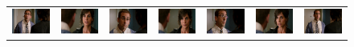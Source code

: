 \begin{figure}
\begin{center}
\begin{tabular}{c c c c c c c}
\includegraphics[width=0.11\linewidth]
  {fig/pat1/dinnerForSchmucks/01.jpg}
& \includegraphics[width=0.11\linewidth]
  {fig/pat1/dinnerForSchmucks/02.jpg}
& \includegraphics[width=0.11\linewidth]
  {fig/pat1/dinnerForSchmucks/03.jpg}
& \includegraphics[width=0.11\linewidth]
  {fig/pat1/dinnerForSchmucks/04.jpg}
& \includegraphics[width=0.11\linewidth]
  {fig/pat1/dinnerForSchmucks/05.jpg}
& \includegraphics[width=0.11\linewidth]
  {fig/pat1/dinnerForSchmucks/06.jpg}
& \includegraphics[width=0.11\linewidth]
  {fig/pat1/dinnerForSchmucks/07.jpg}
\\


\end{tabular}
\end{center}
\end{figure}
